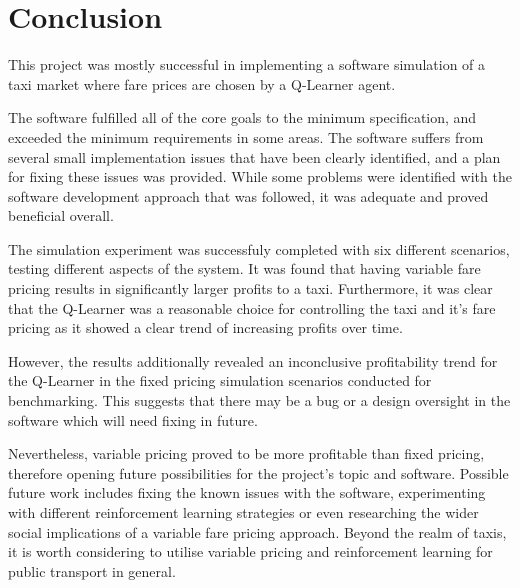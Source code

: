 \newpage
\section{Conclusion}
\label{sec:conclusion}

This project was mostly successful in implementing a software simulation of a
taxi market where fare prices are chosen by a Q-Learner agent. 

The software fulfilled all of the core goals to the minimum specification, and
exceeded the minimum requirements in some areas. The software suffers from
several small implementation issues that have been clearly identified, and a
plan for fixing these issues was provided. While some problems were identified
with the software development approach that was followed, it was adequate and
proved beneficial overall.

The simulation experiment was successfuly completed with six different
scenarios, testing different aspects of the system. It was found that having
variable fare pricing results in significantly larger profits to a taxi.
Furthermore, it was clear that the Q-Learner was a reasonable choice for
controlling the taxi and it's fare pricing as it showed a clear trend of
increasing profits over time.

However, the results additionally revealed an inconclusive profitability trend
for the Q-Learner in the fixed pricing simulation scenarios conducted for
benchmarking. This suggests that there may be a bug or a design oversight in
the software which will need fixing in future.

Nevertheless, variable pricing proved to be more profitable than fixed pricing,
therefore opening future possibilities for the project's topic and software.
Possible future work includes fixing the known issues with the software,
experimenting with different reinforcement learning strategies or even
researching the wider social implications of a variable fare pricing approach.
Beyond the realm of taxis, it is worth considering to utilise variable pricing
and reinforcement learning for public transport in general.
